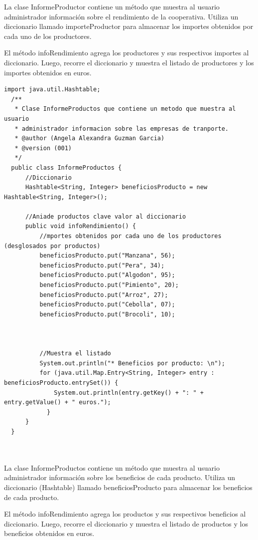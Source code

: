 \documentclass[10pt,a4paper]{article}
\def\StartLineAt#1{\lstset{firstnumber=#1}}
\begin{document}
La clase InformeProductor contiene un método que muestra al usuario administrador información sobre el rendimiento de la cooperativa. Utiliza un diccionario llamado importeProductor para almacenar los importes obtenidos por cada uno de los productores.

El método infoRendimiento agrega los productores y sus respectivos importes al diccionario. Luego, recorre el diccionario y muestra el listado de productores y los importes obtenidos en euros.

\StartLineAt{1}
\begin{lstlisting}[style=Java]
  import java.util.Hashtable;
  /**
   * Clase InformeProductos que contiene un metodo que muestra al usuario
   * administrador informacion sobre las empresas de tranporte.
   * @author (Angela Alexandra Guzman Garcia) 
   * @version (001)
   */
  public class InformeProductos {
      //Diccionario  
      Hashtable<String, Integer> beneficiosProducto = new Hashtable<String, Integer>();
  
      //Aniade productos clave valor al diccionario 
      public void infoRendimiento() {
          //mportes obtenidos por cada uno de los productores (desglosados por productos)
          beneficiosProducto.put("Manzana", 56);
          beneficiosProducto.put("Pera", 34);
          beneficiosProducto.put("Algodon", 95);
          beneficiosProducto.put("Pimiento", 20);
          beneficiosProducto.put("Arroz", 27);
          beneficiosProducto.put("Cebolla", 07);
          beneficiosProducto.put("Brocoli", 10);
          
      
          
          //Muestra el listado 
          System.out.println("* Beneficios por producto: \n");
          for (java.util.Map.Entry<String, Integer> entry : beneficiosProducto.entrySet()) {
              System.out.println(entry.getKey() + ": " + entry.getValue() + " euros.");
            }
      }
  }
  
  
\end{lstlisting}

La clase InformeProductos contiene un método que muestra al usuario administrador información sobre los beneficios de cada producto. Utiliza un diccionario (Hashtable) llamado beneficiosProducto para almacenar los beneficios de cada producto.

El método infoRendimiento agrega los productos y sus respectivos beneficios al diccionario. Luego, recorre el diccionario y muestra el listado de productos y los beneficios obtenidos en euros.
\end{document}
